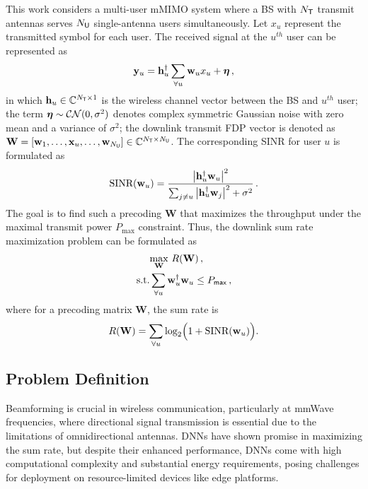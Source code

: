 This work considers a multi-user \gls{mMIMO} system where a \gls{BS} with $N_{\sf{T}}$ transmit antennas serves $N_{\sf{U}}$ single-antenna users simultaneously. Let $x_u$ represent the transmitted symbol for each user. The received signal at the $u^{th}$ user can be represented as 
\begin{equation}\label{eq:signal_recived}
    \mathbf{y}_u =  \mathbf{h}_{u}^{\dagger} \sum_{\forall u}  \mathbf{w}_{u} x_u + \boldsymbol{\eta} \,,
\end{equation}
in which $\mathbf{h}_u \in \mathbb{C}^{N_{\sf{T}} \times 1}$ is the wireless channel vector between the \Gls{BS} and $u^{th}$ user; the term $\boldsymbol{\eta} \sim \mathcal{CN}(0, \sigma^2)$ denotes complex symmetric Gaussian noise with zero mean and a variance of $\sigma^2$; the downlink transmit \gls{FDP} vector is denoted as $\mathbf{W} = \left [ \mathbf{w}_1, \hdots, \mathbf{x}_u, \hdots, \mathbf{w}_{N_{\sf{U}}} \right ] \in \mathbb{C}^{N_{\sf{T}} \times N_{\sf{U}}}$.
The corresponding \gls{SINR} for user $u$ is formulated as
\begin{equation}
    \text{SINR}(\mathbf{w}_{u}) = \frac{ \big|\mathbf{h}^{\dagger}_{u} \mathbf{w}_{u} \big|^2}{\sum_{j \neq u} \big|\mathbf{h}^{\dagger}_{u} \mathbf{w}_{j} \big|^2 + \sigma^2} \,.
\end{equation}
The goal is to find such a precoding $\mathbf{W}$ that maximizes the throughput under the maximal transmit power $P_{\text{max}}$ constraint. Thus, the downlink sum rate maximization problem can be formulated as
\begin{align}\label{eq:sum rate-optimization}
    & \underset{\mathbf{W}}{\max}~ R(\mathbf{W}) \,, \\
    \text{s.t.}  &\sum_{\forall u} \mathbf{w}_{u}^{\dagger}  \mathbf{w}_{u} \leq P_{\sf{max}}\,,
\end{align}
where for a precoding matrix $\mathbf{W}$, the sum rate is
\begin{equation}\label{eq:sum rate}
    R(\mathbf{W}) = \sum_{\forall u} \text{log}_2 \Bigl(  1+ \text{SINR}(\mathbf{w}_{u}) \Bigr).
\end{equation}

\subsection{Problem Definition}

Beamforming is crucial in wireless communication, particularly at mmWave frequencies, where directional signal transmission is essential due to the limitations of omnidirectional antennas. \Glspl{DNN} have shown promise in maximizing the sum rate, but despite their enhanced performance, \glspl{DNN} come with high computational complexity and substantial energy requirements, posing challenges for deployment on resource-limited devices like edge platforms.

